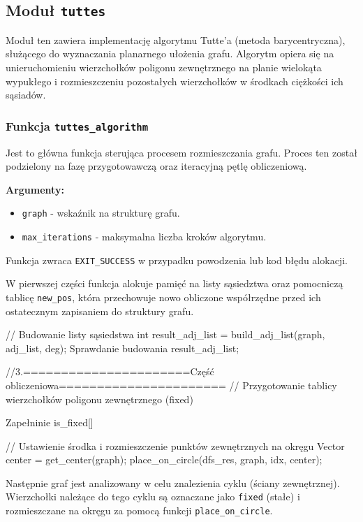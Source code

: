 \documentclass[]{article}
\begin{document}
\subsection{Moduł \texttt{tuttes}}
Moduł ten zawiera implementację algorytmu Tutte’a (metoda barycentryczna), służącego do wyznaczania planarnego ułożenia grafu. Algorytm opiera się 
na unieruchomieniu wierzchołków poligonu zewnętrznego na planie wielokąta wypukłego i rozmieszczeniu pozostałych wierzchołków w środkach ciężkości ich sąsiadów.

\subsubsection{Funkcja \texttt{tuttes\_algorithm}}
Jest to główna funkcja sterująca procesem rozmieszczania grafu. Proces ten został podzielony na fazę przygotowawczą oraz iteracyjną pętlę obliczeniową.

\textbf{Argumenty:}
\begin{itemize}
\item \texttt{graph} - wskaźnik na strukturę grafu.
\item \texttt{max\_iterations} - maksymalna liczba kroków algorytmu.
\end{itemize}
Funkcja zwraca \texttt{EXIT\_SUCCESS} w przypadku powodzenia lub kod błędu alokacji.


W pierwszej części funkcja alokuje pamięć na listy sąsiedztwa oraz pomocniczą tablicę \texttt{new\_pos}, która przechowuje nowo obliczone współrzędne przed ich ostatecznym zapisaniem do struktury grafu.

\begin{mylisting}
// Budowanie listy sąsiedstwa
    int result_adj_list = build_adj_list(graph, adj_list, deg);
    Sprawdanie budowania result_adj_list;
    


    //3.======================Część obliczeniowa======================
    // Przygotowanie tablicy wierzchołków poligonu zewnętrznego (fixed)
   
    Zapełninie is_fixed[]

    // Ustawienie środka i rozmieszczenie punktów zewnętrznych na okręgu
    Vector center = get_center(graph);
    place_on_circle(dfs_res, graph, idx, center);

\end{mylisting}
Następnie graf jest analizowany w celu znalezienia cyklu (ściany zewnętrznej). Wierzchołki należące do tego cyklu są oznaczane jako \texttt{fixed} (stałe) i rozmieszczane na okręgu za pomocą funkcji \texttt{place\_on\_circle}.
\end{document}
